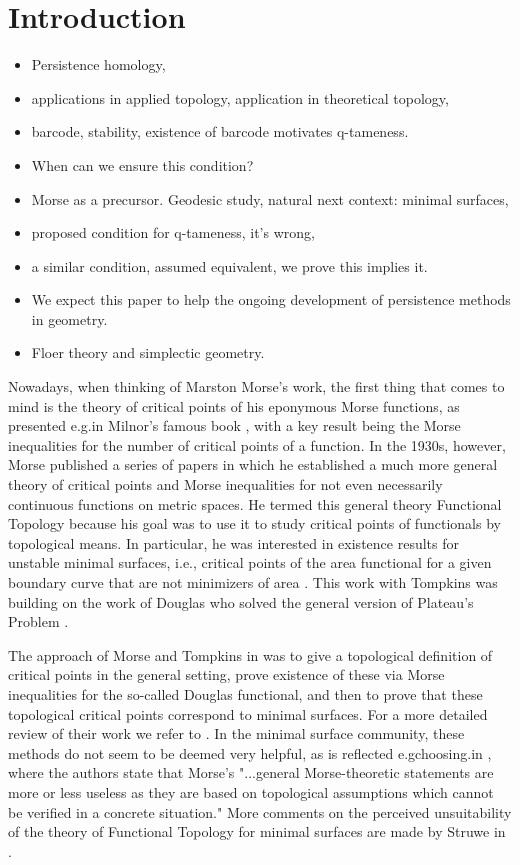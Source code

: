 
\section{Introduction}

\begin{itemize}
	\item Persistence homology, 
	\item applications in applied topology, application in theoretical topology, 
	\item barcode, stability, existence of barcode motivates q-tameness. 
	\item When can we ensure this condition? 
	\item Morse as a precursor. Geodesic study, natural next context: minimal surfaces, \item proposed condition for q-tameness, it's wrong, 
	\item a similar condition, assumed equivalent, we prove this implies it.
	\item We expect this paper to help the ongoing development of persistence methods in geometry.
	\item Floer theory and simplectic geometry.
\end{itemize}

Nowadays, when thinking of Marston Morse's work, the first thing that comes to mind is the theory of critical points of his eponymous Morse functions, as presented e.g.\@ in Milnor's famous book \cite{MR0163331}, with a key result being the Morse inequalities for the number of critical points of a function. In the 1930s, however, Morse published a series of papers \cite{Morse.1937, Morse.1938, Morse.1940, MR9102} in which he established a much more general theory of critical points and Morse inequalities for not even necessarily continuous functions on metric spaces. He termed this general theory Functional Topology because his goal was to use it to study critical points of functionals by topological means. In particular, he was interested in existence results for unstable minimal surfaces, i.e., critical points of the area functional for a given boundary curve that are not minimizers of area \cite{Morse.1939,Morse.1941}. This work with Tompkins was building on the work of Douglas who solved the general version of Plateau's Problem \cite{Douglas.1931}.

The approach of Morse and Tompkins in \cite{Morse.1939} was to give a topological definition of critical points in the general setting, prove existence of these via Morse inequalities for the so-called Douglas functional, and then to prove that these topological critical points correspond to minimal surfaces. For a more detailed review of their work we refer to \cite{Struwe.1988}. In the minimal surface community, these methods do not seem to be deemed very helpful, as is reflected e.gchoosing.\@ in \cite[p.472]{MR2566897}, where the authors state that Morse's "...general Morse-theoretic statements are more or less useless as they are based on topological assumptions which cannot be verified in a concrete situation." More comments on the perceived unsuitability of the theory of Functional Topology for minimal surfaces are made by Struwe in \cite{MR850612}. 


